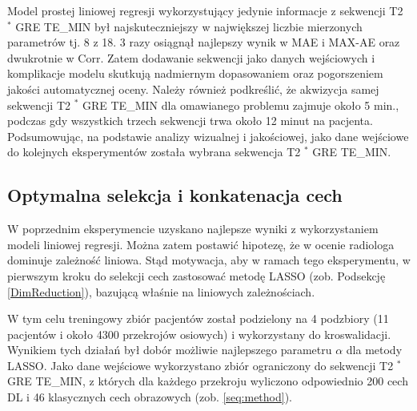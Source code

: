 Model prostej liniowej regresji wykorzystujący jedynie informacje z sekwencji T2 $^\ast$ GRE TE\_MIN był najskuteczniejszy w największej liczbie mierzonych parametrów tj. 8 z 18. 3 razy osiągnął najlepszy wynik w MAE i MAX-AE oraz dwukrotnie w Corr. Zatem dodawanie sekwencji jako danych wejściowych i komplikacje modelu skutkują nadmiernym dopasowaniem oraz pogorszeniem jakości automatycznej oceny. Należy również podkreślić, że akwizycja samej sekwencji T2 $^\ast$ GRE TE\_MIN dla omawianego problemu zajmuje około 5 min., podczas gdy wszystkich trzech sekwencji trwa około 12 minut na pacjenta. Podsumowując, na podstawie analizy wizualnej i jakościowej, jako dane wejściowe do kolejnych eksperymentów została wybrana sekwencja T2 $^\ast$ GRE TE\_MIN. 

\subsection{Optymalna selekcja i konkatenacja cech}
\label{seq:fusion}
W poprzednim eksperymencie uzyskano najlepsze wyniki z wykorzystaniem modeli liniowej regresji. Można zatem postawić hipotezę, że w ocenie radiologa dominuje zależność liniowa. Stąd motywacja, aby w ramach tego eksperymentu, w pierwszym kroku do selekcji cech zastosować metodę LASSO (zob. Podsekcję \ref{DimReduction}), bazującą właśnie na liniowych zależnościach.  

W tym celu treningowy zbiór pacjentów został podzielony na 4 podzbiory (11 pacjentów i około 4300 przekrojów osiowych) i wykorzystany do kroswalidacji. Wynikiem tych działań był dobór możliwie najlepszego parametru $\alpha$ dla metody LASSO. Jako dane wejściowe wykorzystano zbiór ograniczony do sekwencji T2 $^\ast$ GRE TE\_MIN, z których dla każdego przekroju wyliczono odpowiednio 200 cech DL i 46 klasycznych cech obrazowych (zob. \ref{seq:method}).

